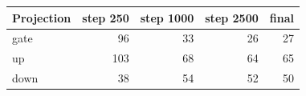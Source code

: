 \begin{tabular}{lrrrr}
\toprule
Projection & step 250 & step 1000 & step 2500 & final \\
\midrule
gate & 96 & 33 & 26 & 27 \\
up & 103 & 68 & 64 & 65 \\
down & 38 & 54 & 52 & 50 \\
\bottomrule
\end{tabular}
